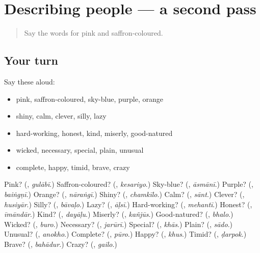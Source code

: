 \section[(dialogue)]{Describing people — a second pass}

\label{lesson:MW-R149-second-pass-describing-people}



\begin{quote}
Say the words for pink and saffron-coloured.
\end{quote}

\subsection*{Your turn}
Say these aloud:

\begin{itemize}
\raggedright
  \item pink, saffron-coloured, sky-blue, purple, orange
  \item shiny, calm, clever, silly, lazy
  \item hard-working, honest, kind, miserly, good-natured
  \item wicked, necessary, special, plain, unusual
  \item complete, happy, timid, brave, crazy
\end{itemize}

\begin{tcolorbox}[breakable,colback=teal!4,colframe=teal!35!black,title={Before you move on}]
Pink? (\textbf{}, \emph{gulābī}.) Saffron-coloured? (\textbf{}, \emph{kesariyo}.) Sky-blue? (\textbf{}, \emph{āsmānī}.) Purple? (\textbf{}, \emph{baiṅgṇī}.) Orange? (\textbf{}, \emph{nāraṅgī}.) Shiny? (\textbf{}, \emph{chamkīlo}.) Calm? (\textbf{}, \emph{sānt}.) Clever? (\textbf{}, \emph{husiyār}.) Silly? (\textbf{}, \emph{bāvaḷo}.) Lazy? (\textbf{}, \emph{āḷsī}.) Hard-working? (\textbf{}, \emph{mehantī}.) Honest? (\textbf{}, \emph{īmāndār}.) Kind? (\textbf{}, \emph{dayāḷu}.) Miserly? (\textbf{}, \emph{kañjūs}.) Good-natured? (\textbf{}, \emph{bhalo}.) Wicked? (\textbf{}, \emph{buro}.) Necessary? (\textbf{}, \emph{jarūrī}.) Special? (\textbf{}, \emph{khās}.) Plain? (\textbf{}, \emph{sādo}.) Unusual? (\textbf{}, \emph{anokho}.) Complete? (\textbf{}, \emph{pūro}.) Happy? (\textbf{}, \emph{khus}.) Timid? (\textbf{}, \emph{ḍarpok}.) Brave? (\textbf{}, \emph{bahādur}.) Crazy? (\textbf{}, \emph{gailo}.)
\end{tcolorbox}
